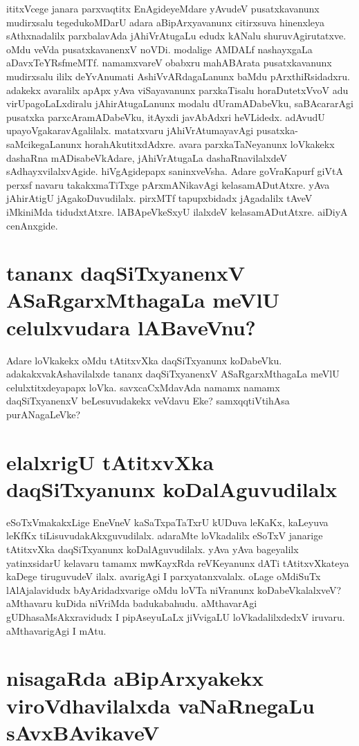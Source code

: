 ititxVcege janara parxvaqtitx EnAgideyeMdare yAvudeV pusatxkavanunx mudirxsalu tegedukoMDarU adara aBipArxyavanunx citirxsuva hinenxleya sAthxnadalilx parxbalavAda jAhiVrAtugaLu edudx kANalu shuruvAgirutatxve. oMdu veVda pusatxkavanenxV noVDi. modalige AMDALf nashayxgaLa aDavxTeYRsfmeMTf. namamxvareV obabxru mahABArata pusatxkavanunx mudirxsalu ililx deYvAnumati AshiVvARdagaLanunx baMdu pArxthiRsidadxru. adakekx avaralilx apApx yAva viSayavanunx parxkaTisalu horaDutetxVvoV adu virUpagoLaLxdiralu jAhirAtugaLanunx modalu dUramADabeVku, saBAcararAgi pusatxka parxcAramADabeVku, itAyxdi javAbAdxri heVLidedx. adAvudU upayoVgakaravAgalilalx. matatxvaru jAhiVrAtumayavAgi pusatxka-saMcikegaLanunx horahAkutitxdAdxre. avara parxkaTaNeyanunx loVkakekx dashaRna mADisabeVkAdare, jAhiVrAtugaLa dashaRnavilalxdeV sAdhayxvilalxvAgide. hiVgAgidepapx saninxveVsha. Adare goVraKapurf giVtA perxsf navaru takakxmaTiTxge pArxmANikavAgi kelasamADutAtxre. yAva jAhirAtigU jAgakoDuvudilalx. pirxMTf tapupxbidadx jAgadalilx tAveV iMkiniMda tidudxtAtxre. lABApeVkeSxyU ilalxdeV kelasamADutAtxre. aiDiyA cenAnxgide. 

\section*{tananx daqSiTxyanenxV ASaRgarxMthagaLa meVlU celulxvudara lABaveVnu?}

Adare loVkakekx oMdu tAtitxvXka daqSiTxyanunx koDabeVku. adakakxvakAshavilalxde tananx daqSiTxyanenxV ASaRgarxMthagaLa meVlU celulxtitxdeyapapx loVka. savxcaCxMdavAda namamx namamx daqSiTxyanenxV beLesuvudakekx  veVdavu Eke? samxqqtiVtihAsa purANagaLeVke?

\section*{elalxrigU tAtitxvXka daqSiTxyanunx koDalAguvudilalx}

eSoTxVmakakxLige EneVneV kaSaTxpaTaTxrU kUDuva leKaKx, kaLeyuva leKfKx tiLisuvudakAkxguvudilalx. adaraMte loVkadalilx eSoTxV janarige tAtitxvXka daqSiTxyanunx koDalAguvudilalx. yAva yAva bageyalilx yatinxsidarU kelavaru tamamx mwKayxRda reVKeyanunx dATi tAtitxvXkateya kaDege tiruguvudeV ilalx. avarigAgi I parxyatanxvalalx. oLage oMdiSuTx lAlAjalavidudx bAyAridadxvarige oMdu loVTa niVranunx koDabeVkalalxveV? aMthavaru kuDida niVriMda badukabahudu. aMthavarAgi gUDhasaMsAkxravidudx I pipAseyuLaLx jiVvigaLU loVkadalilxdedxV iruvaru. aMthavarigAgi I mAtu.

\section*{nisagaRda aBipArxyakekx viroVdhavilalxda vaNaRnegaLu sAvxBAvikaveV}

